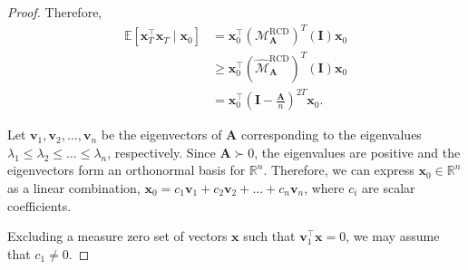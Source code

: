 \documentclass{article}
\theoremstyle{plain}
\theoremstyle{definition}
\theoremstyle{remark}
\def\bigopen#1{\left(#1\right)}
\def\bigclosed#1{\left[#1\right]}
\newcommand{\RCD}{\text{RCD}} %
\newcommand{\MARCD}{\mathcal{M}_{\bm{A}}^{\RCD}} %
\def\vv{{\bm{v}}}
\def\vx{{\bm{x}}}
\def\mA{{\bm{A}}}
\def\mI{{\bm{I}}}
\def\gM{{\mathcal{M}}}
\newcommand{\E}{\mathbb{E}}
\newcommand{\R}{\mathbb{R}}
\begin{document}
\begin{proof}
Therefore, 
\begin{align*}
    \E \bigclosed{\vx_T^{\top} \vx_T\mid \vx_0} &= \vx_0^{\top} (\MARCD)^T (\mI) \vx_0 \\
    &\ge \vx_0^{\top} (\widehat{\gM}^{\RCD}_{\mA})^T (\mI) \vx_0 \\
    &= \vx_0^{\top} \bigopen{\mI - \frac{\mA}{n}}^{2T} \vx_0.
\end{align*}

Let $\vv_1, \vv_2, \dots, \vv_n$ be the eigenvectors of $\mA$ corresponding to the eigenvalues $\lambda_1 \le \lambda_2 \le \dots \le \lambda_n$, respectively. Since $\mA\succ 0$, the eigenvalues are positive and the eigenvectors form an orthonormal basis for $\R^n$. Therefore, we can express $\vx_0 \in \R^n$ as a linear combination, $\vx_0 = c_1 \vv_1 + c_2 \vv_2 + \dots + c_n \vv_n$, where $c_i$ are scalar coefficients.


Excluding a measure zero set of vectors $\vx$ such that $\vv_1^{\top} \vx = 0$, we may assume that $c_1 \ne 0$. 


\end{proof}
\end{document}
